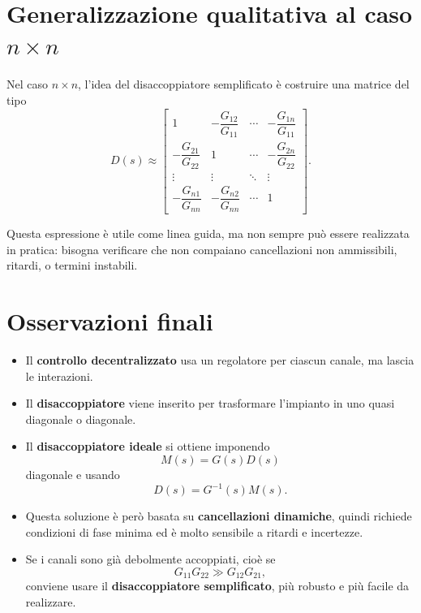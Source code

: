 \section{Generalizzazione qualitativa al caso \(n\times n\)}

Nel caso \(n\times n\), l'idea del disaccoppiatore semplificato è costruire una matrice del tipo
\[
D(s)\approx
\begin{bmatrix}
1 & -\dfrac{G_{12}}{G_{11}} & \cdots & -\dfrac{G_{1n}}{G_{11}}\\[0.8em]
-\dfrac{G_{21}}{G_{22}} & 1 & \cdots & -\dfrac{G_{2n}}{G_{22}}\\
\vdots & \vdots & \ddots & \vdots\\
-\dfrac{G_{n1}}{G_{nn}} & -\dfrac{G_{n2}}{G_{nn}} & \cdots & 1
\end{bmatrix}.
\]

Questa espressione è utile come linea guida, ma non sempre può essere realizzata in pratica: bisogna verificare che non compaiano cancellazioni non ammissibili, ritardi, o termini instabili.

\section{Osservazioni finali}

\begin{itemize}
    \item Il \textbf{controllo decentralizzato} usa un regolatore per ciascun canale, ma lascia le interazioni.
    \item Il \textbf{disaccoppiatore} viene inserito per trasformare l'impianto in uno quasi diagonale o diagonale.
    \item Il \textbf{disaccoppiatore ideale} si ottiene imponendo
    \[
    M(s)=G(s)D(s)
    \]
    diagonale e usando
    \[
    D(s)=G^{-1}(s)M(s).
    \]
    \item Questa soluzione è però basata su \textbf{cancellazioni dinamiche}, quindi richiede condizioni di fase minima ed è molto sensibile a ritardi e incertezze.
    \item Se i canali sono già debolmente accoppiati, cioè se
    \[
    G_{11}G_{22}\gg G_{12}G_{21},
    \]
    conviene usare il \textbf{disaccoppiatore semplificato}, più robusto e più facile da realizzare.
\end{itemize}